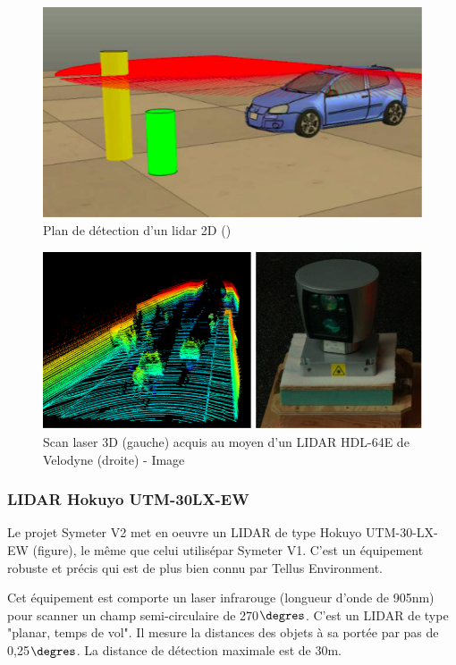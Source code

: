 \documentclass[12pt,a4paper]{report}
\begin{document}
	\begin{figure}[h!]
		\centering
		\includegraphics[width=0.7\linewidth]{img/lidar2d}
		\caption[Lidar 2D]{Plan de détection d'un lidar 2D (\cite{yalcin_approaches_2013})}
		\label{fig:lidar2d}
	\end{figure}

	\begin{figure}[h!]
	\centering
	\includegraphics[width=0.7\linewidth]{img/lidar3d}
	\caption[lidar3d]{Scan laser 3D (gauche) acquis au moyen d'un LIDAR \hspace{\textwidth} HDL-64E de Velodyne (droite) - Image \cite{steinbauer_tedusar_2014}}
	\label{fig:lidar3d}
	\end{figure}

	
		
		\subsubsection{LIDAR Hokuyo UTM-30LX-EW}
		Le projet Symeter V2 met en oeuvre un LIDAR de type Hokuyo UTM-30-LX-EW (figure), le même que celui utilisépar Symeter V1. C'est un équipement robuste et précis qui est de plus bien connu par Tellus Environment.
		
		\para Cet équipement est comporte un laser infrarouge (longueur d'onde de 905nm) pour scanner un champ semi-circulaire de 270$\degres$. C'est un LIDAR de type "planar, temps de vol". Il mesure la distances des objets à sa portée par pas de 0,25$\degres$. La distance de détection maximale est de 30m.
		\newline
		
\end{document}
